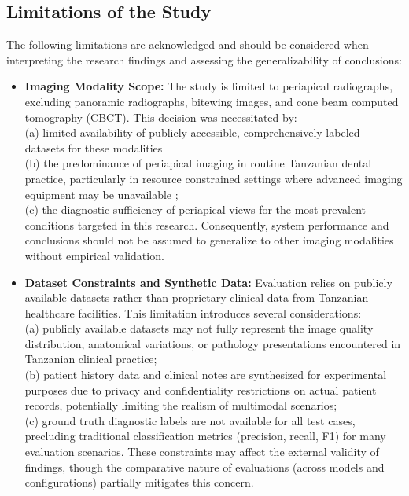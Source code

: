 \documentclass[12pt,a4paper]{report}
\begin{document}
	
	\subsection{Limitations of the Study}
	The following limitations are acknowledged and should be considered when interpreting the research findings and assessing the generalizability of conclusions:
	
	\begin{itemize}
		\item \textbf{Imaging Modality Scope:} The study is limited to periapical radiographs, excluding panoramic radiographs, bitewing images, and cone beam computed tomography (CBCT). This decision was necessitated by: \\
		(a) limited availability of publicly accessible, comprehensively labeled datasets for these modalities 
		\cite{huang2024multimodal_dental} \\
		(b) the predominance of periapical imaging in routine Tanzanian dental practice, particularly in resource constrained settings where advanced imaging equipment may be unavailable \cite{Edward2024OralHealthTZ}; \\
		(c) the diagnostic sufficiency of periapical views for the most prevalent conditions targeted in this research. Consequently, system performance and conclusions should not be assumed to generalize to other imaging modalities without empirical validation.
		
		\item \textbf{Dataset Constraints and Synthetic Data:} Evaluation relies on publicly available datasets rather than proprietary clinical data from Tanzanian healthcare facilities. This limitation introduces several considerations: \\
		(a) publicly available datasets may not fully represent the image quality distribution, anatomical variations, or pathology presentations encountered in Tanzanian clinical practice; \\
		(b) patient history data and clinical notes are synthesized for experimental purposes due to privacy and confidentiality restrictions on actual patient records, potentially limiting the realism of multimodal scenarios; \\
		(c) ground truth diagnostic labels are not available for all test cases, precluding traditional classification metrics (precision, recall, F1) for many evaluation scenarios. These constraints may affect the external validity of findings, though the comparative nature of evaluations (across models and configurations) partially mitigates this concern.
		

\end{itemize}
\end{document}
